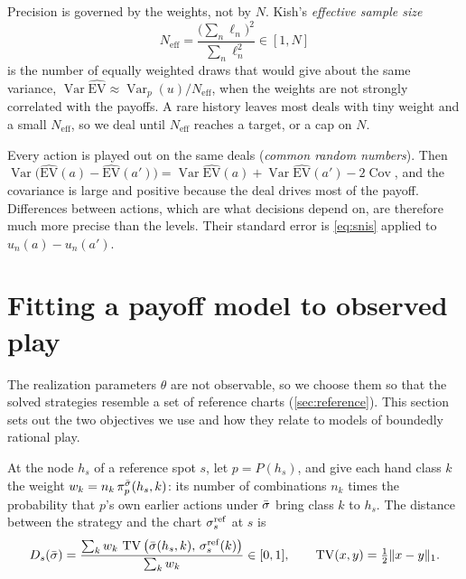 Precision is governed by the weights, not by $N$. Kish's \emph{effective sample size}~\cite{kish1965}
\[
  N_{\mathrm{eff}} = \frac{\big(\sum_n \ell_n\big)^2}{\sum_n \ell_n^2} \in [1, N]
\]
is the number of equally weighted draws that would give about the same variance, $\operatorname{Var}
\widehat{\mathrm{EV}} \approx \operatorname{Var}_p(u)/N_{\mathrm{eff}}$, when the weights are not strongly
correlated with the payoffs. A rare history leaves most deals with tiny weight and a small $N_{\mathrm{eff}}$, so we
deal until $N_{\mathrm{eff}}$ reaches a target, or a cap on $N$.

Every action is played out on the same deals (\emph{common random numbers}). Then
$\operatorname{Var}\big(\widehat{\mathrm{EV}}(a) - \widehat{\mathrm{EV}}(a')\big) = \operatorname{Var}
\widehat{\mathrm{EV}}(a) + \operatorname{Var}\widehat{\mathrm{EV}}(a') - 2\operatorname{Cov}$, and the covariance is
large and positive because the deal drives most of the payoff. Differences between actions, which are what decisions
depend on, are therefore much more precise than the levels. Their standard error is \eqref{eq:snis} applied to
$u_n(a) - u_n(a')$.

\section{Fitting a payoff model to observed play}\label{sec:fitting-maths}

The realization parameters $\theta$ are not observable, so we choose them so that the solved strategies resemble a set
of reference charts (\cref{sec:reference}). This section sets out the two objectives we use and how they relate to
models of boundedly rational play.

\begin{definition}\label{def:tv-distance}
At the node $h_s$ of a reference spot $s$, let $p = P(h_s)$, and give each hand class $k$ the weight $w_k = n_k\,
\pi^{\bar\sigma}_p(h_s,k)$: its number of combinations $n_k$ times the probability that $p$'s own earlier actions
under $\bar\sigma$ bring class $k$ to $h_s$. The distance between the strategy and the chart $\sigma^{\mathrm{ref}}_s$
at $s$ is
\[
  D_s(\bar\sigma) = \frac{\sum_k w_k\, \operatorname{TV}\big(\bar\sigma(h_s,k),\, \sigma^{\mathrm{ref}}_s(k)\big)}{\sum_k w_k}
  \in [0,1], \qquad \operatorname{TV}(x,y) = \tfrac12 \lVert x - y \rVert_1 .
\]
\end{definition}

